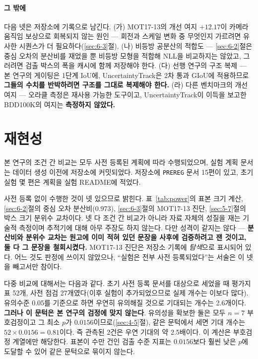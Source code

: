 \documentclass[12pt,a4paper,oneside]{report}
\begin{document}
\paragraph{그 밖에} 다음 넷은 저장소에 기록으로 남긴다. (가) MOT17-13의 개선 여지 $+12.17$이 카메라 움직임 보상으로 회복되지 않는 원인 --- 회전과 스케일 변화 중 무엇인지 가르려면 유사한 시퀀스가 더 필요하다(\ref{sec:6-3}절). (나) 비등방 공분산의 적합도 --- \ref{sec:6-2}절은 중심 오차의 분산비를 재었을 뿐 비등방 모형을 적합해 NLL을 비교하지는 않았고, 그러려면 검출 박스의 폭을 캐시에 함께 저장해야 한다. (다) 선행 연구의 구조 복제 --- 본 연구의 게이팅은 1단계 IoU에, UncertaintyTrack은 2차 통과 GIoU에 적용하므로 \textbf{그들의 수치를 반박하려면 구조를 그대로 복제해야 한다.} (라) 다른 벤치마크의 개선 여지 --- 오라클 측정은 재사용 가능한 도구이고, UncertaintyTrack이 이득을 보고한 BDD100K의 여지는 \textbf{측정하지 않았다.}

\section{재현성}\label{sec:7-5}

본 연구의 조건 간 비교는 모두 사전 등록된 계획에 따라 수행되었으며, 실험 계획 문서는 데이터 생성 이전에 저장소에 커밋되었다. 저장소에 \texttt{PREREG} 문서 15편이 있고, 초기 실험 몇 편은 계획을 실험 README에 적었다.

사전 등록 없이 수행한 것이 넷 있으므로 밝힌다. 표~\ref{tab:power}의 표본 크기 계산, \ref{sec:6-2}절의 중심 오차 분산비($0.973$), \ref{sec:6-3}절의 MOT17-13 진단, \ref{sec:5-7}절의 박스 크기 분위수 교차이다. 넷 다 조건 간 비교가 아니라 자료 자체의 성질을 재는 기술적 측정이며 추적기에 대해 아무 주장도 하지 않는다. 다만 성격이 같지는 않다 --- \textbf{분산비와 분위수 교차는 원고에 이미 적혀 있던 문장을 사후에 검증하려고 잰 것이고, 둘 다 그 문장을 철회시켰다.} MOT17-13 진단은 저장소 기록에 \textit{탐색}으로 표시되어 있다. 어느 것도 판정에 쓰이지 않았으나, ``실험은 전부 사전 등록되었다''는 서술은 이 넷을 빼고서만 참이다.

다중 비교에 대해서는 다음과 같다. 초기 사전 등록 문서를 대상으로 세었을 때 평가지표 52개, 사전 점검 27개였다(이후 실험이 추가되었으므로 실제 개수는 이보다 많다). 유의수준 0.05를 기준으로 하면 우연히 유의해질 것으로 기대되는 개수는 2.6개이다. \textbf{그러나 이 문턱은 본 연구의 검정에 맞지 않는다}. 유의성을 확보한 둘은 모두 $n=7$ 부호검정이고 그 최소 $p$가 $0.0156$이므로(\ref{sec:4-5}절), 같은 문턱에서 세면 기대 개수는 $52 \times 0.0156 = \mathbf{0.81}$이다. 즉 관측된 2건은 우연 기대의 약 2.5배이다. 이 계산은 부호검정 계열에만 해당한다. 표본이 수만 건인 검출 수준 지표는 $0.0156$보다 훨씬 낮은 $p$에 도달할 수 있어 같은 문턱으로 묶이지 않는다.
\end{document}
